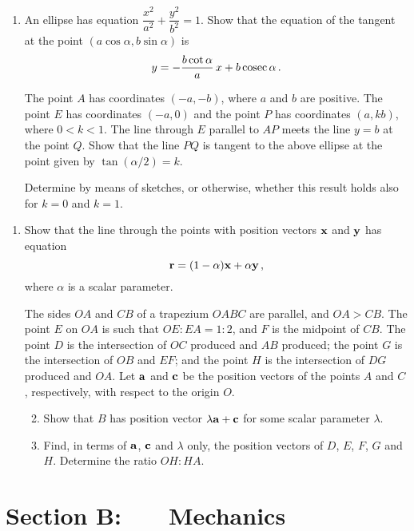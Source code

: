 \documentclass[a4, 11pt]{report}
\newlength{\qspace}
\newcounter{qnumber}
\newenvironment{question}%
 {\vspace{\qspace}
  \begin{enumerate}[\bfseries 1\quad][10]%
    \setcounter{enumi}{\value{qnumber}}%
    \item%
 }
{
  \end{enumerate}
  \filbreak
  \stepcounter{qnumber}
 }
\newenvironment{questionparts}[1][1]%
 {
  \begin{enumerate}[\bfseries (i)]%
    \setcounter{enumii}{#1}
    \addtocounter{enumii}{-1}
    \setlength{\itemsep}{5mm}
    \setlength{\parskip}{8pt}
 }
 {
  \end{enumerate}
 }
\begin{document}
\begin{question}
An ellipse has equation $\dfrac{x^2}{a^2}  +\dfrac {y^2}{b^2} =
1$. Show that 
the equation of the tangent at the point $(a\cos\alpha, b\sin\alpha)$ is
\[
y=- \frac {b  \cot \alpha} a \, x + b\, {\rm cosec\,}\alpha\,.
\]


The point $A$ has coordinates $(-a,-b)$, where $a$ and $b$ are
positive. The point $E$ has coordinates $(-a,0)$
and the point $P$ has coordinates $(a,kb)$, where $0<k<1$.
The line through $E$ parallel to  $AP$ meets the line $y=b$ at
the point $Q$. Show that the line $PQ$ is tangent to the above ellipse
at the point given by $\tan(\alpha/2)=k$.

Determine by means of sketches, or otherwise, whether this result
holds also for $k=0$ and $k=1$.
\end{question}
		
\begin{question}	
Show that the line through the points with position
vectors $\bf x$ and $\bf y$ has equation 
\[{\bf r} = (1-\alpha){\bf x} +\alpha {\bf y}\,,
\]
where $\alpha$ is a scalar parameter.

The sides $OA$ and $CB$ of a trapezium $OABC$ are parallel, and $OA>CB$.
The point $E$ on $OA$ is such that $OE : EA = 1:2$, and $F$ is the midpoint of 
$CB$. The point $D$ is the intersection of $OC$ produced and $AB$ produced;
the point $G$ is the intersection of $OB$ and $EF$; and the point $H$ 
is the intersection of $DG$ produced and $OA$. Let $\bf a$ and $\bf c$ be the 
position vectors of the points $A$ and $C$, respectively, with respect to
the origin $O$.

\begin{questionparts}
\item Show that $B$ has position vector $\lambda {\bf a} + {\bf c}$ for
some scalar parameter $\lambda$.

\item Find, in terms of $\bf a$, $\bf c$ and $\lambda$
only, the position vectors of $D$, $E$, $F$, $G$ and $H$.
Determine the ratio  $OH:HA$.
\end{questionparts}
\end{question}	
		

		
	
\newpage
\section*{Section B: \ \ \ Mechanics}
\end{document}
